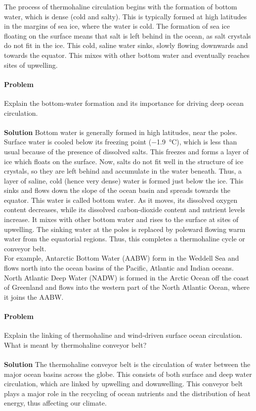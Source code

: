 \documentclass[10pt]{article}
\newcounter{prob}
\def\problem{\stepcounter{prob}\paragraph{Problem \arabic{prob}}}
\def\solution{\\\\\textbf{Solution }}
\begin{document}
        The process of thermohaline circulation begins with the formation of bottom water, which is dense (cold and salty). This is typically
        formed at high latitudes in the margins of sea ice, where the water is cold. The formation of sea ice floating on the surface means
        that salt is left behind in the ocean, as salt crystals do not fit in the ice. This cold, saline water sinks,
        slowly flowing downwards and towards the equator. This mixes with other bottom water and eventually reaches sites of upwelling.


        \problem Explain the bottom-water formation and its importance for driving deep ocean circulation.
        \solution Bottom water is generally formed in high latitudes, near the poles. Surface water is cooled below its freezing point
        (\SI{-1.9}{\celsius}), which is less than usual because of the presence of dissolved salts. This freezes and forms a layer of
        ice which floats on the surface. Now, salts do not fit well in the structure of ice crystals, so they are left behind and accumulate
        in the water beneath. Thus, a layer of saline, cold (hence very dense) water is formed just below the ice. This sinks and flows down
        the slope of the ocean basin and spreads towards the equator. This water is called bottom water. As it moves, its dissolved oxygen content
        decreases, while its dissolved carbon-dioxide content and nutrient levels increase. It mixes with other bottom water and
        rises to the surface at sites of upwelling. The sinking water at the poles is replaced by poleward flowing warm water from the equatorial
        regions. Thus, this completes a thermohaline cycle or conveyor belt. \\
        
        For example, Antarctic Bottom Water (AABW) form in the Weddell Sea and flows north into the ocean basins of the Pacific, Atlantic and
        Indian oceans. North Atlantic Deep Water (NADW) is formed in the Arctic Ocean off the coast of Greenland and flows into the western
        part of the North Atlantic Ocean, where it joins the AABW.


        \problem Explain the linking of thermohaline and wind-driven surface ocean circulation.
        What is meant by thermohaline conveyor belt?
        \solution The thermohaline conveyor belt is the circulation of water between the major ocean basins across the globe. This consists
        of both surface and deep water circulation, which are linked by upwelling and downwelling. This conveyor belt plays a major role in 
        the recycling of ocean nutrients and the distribution of heat energy, thus affecting our climate. \\
\end{document}
